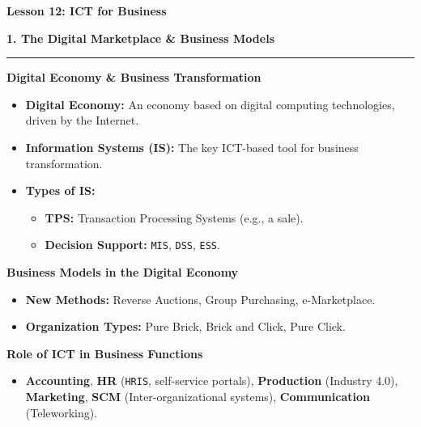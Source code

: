 \documentclass[a4paper, 8pt]{extarticle}
\newcommand{\sectionheading}[1]{\large\textbf{#1}\par\noindent\rule{\linewidth}{0.4pt}}
\newcommand{\subsectionheading}[1]{\normalsize\textbf{#1}}
\begin{document}
\pagestyle{empty} %

\begin{center}
    \fontsize{12pt}{14pt}\selectfont
    \textbf{Lesson 12: ICT for Business}
\end{center}
\vspace{1em}

\begin{multicols}{2}


\sectionheading{1. The Digital Marketplace \& Business Models}
\vspace{0.5em}
\subsectionheading{Digital Economy \& Business Transformation}
\begin{itemize}
    \item \textbf{Digital Economy:} An economy based on digital computing technologies, driven by the Internet.
    \item \textbf{Information Systems (IS):} The key ICT-based tool for business transformation.
    \item \textbf{Types of IS:}
    \begin{itemize}
        \item \textbf{TPS:} Transaction Processing Systems (e.g., a sale).
        \item \textbf{Decision Support:} \texttt{MIS}, \texttt{DSS}, \texttt{ESS}.
    \end{itemize}
\end{itemize}

\subsectionheading{Business Models in the Digital Economy}
\begin{itemize}
    \item \textbf{New Methods:} Reverse Auctions, Group Purchasing, e-Marketplace.
    \item \textbf{Organization Types:} Pure Brick, Brick and Click, Pure Click.
\end{itemize}

\subsectionheading{Role of ICT in Business Functions}
\begin{itemize}
    \item \textbf{Accounting}, \textbf{HR} (\texttt{HRIS}, self-service portals), \textbf{Production} (Industry 4.0), \textbf{Marketing}, \textbf{SCM} (Inter-organizational systems), \textbf{Communication} (Teleworking).
\end{itemize}


\end{multicols}
\end{document}
